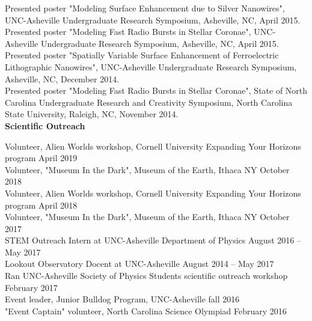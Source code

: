 \documentclass[letterpaper, 11pt]{article}
\newcommand{\noi}{\noindent}
\begin{document}
\noi Presented poster "Modeling Surface Enhancement due to Silver Nanowires", UNC-Asheville Undergraduate Research Symposium, Asheville, NC, April 2015.
\\

\noi Presented poster "Modeling Fast Radio Bursts in Stellar Coronae", UNC-Asheville Undergraduate Research Symposium, Asheville, NC, April 2015.
\\

\noi Presented poster "Spatially Variable Surface Enhancement of
Ferroelectric Lithographic Nanowires", UNC-Asheville Undergraduate Research Symposium, Asheville, NC, December 2014.
\\

\noi Presented poster "Modeling Fast Radio Bursts in Stellar Coronae", State of North Carolina Undergraduate Research and Creativity Symposium, North Carolina State University, Raleigh, NC, November 2014.
\\

\noi \textbf{Scientific Outreach}

\noi Volunteer, Alien Worlds workshop, Cornell University Expanding Your Horizons program \hfill April 2019
\\

\noi Volunteer, "Museum In the Dark", Museum of the Earth, Ithaca NY \hfill October 2018
\\

\noi Volunteer, Alien Worlds workshop, Cornell University Expanding Your Horizons program \hfill April 2018
\\

\noi Volunteer, "Museum In the Dark", Museum of the Earth, Ithaca NY \hfill October 2017
\\

\noi STEM Outreach Intern at UNC-Asheville Department of Physics \hfill August 2016 -- May 2017
\\

\noi Lookout Observatory Docent at UNC-Asheville \hfill August 2014 -- May 2017
\\

\noi Ran UNC-Asheville Society of Physics Students scientific outreach workshop \hfill February 2017
\\

\noi Event leader, Junior Bulldog Program, UNC-Asheville \hfill fall 2016 
\\

\noi "Event Captain" volunteer, North Carolina Science Olympiad \hfill February 2016
\\
\end{document}
